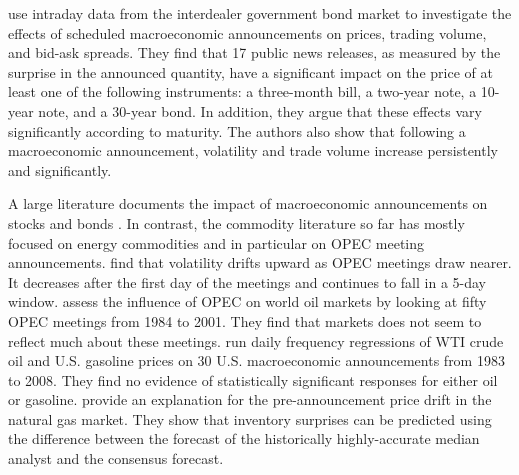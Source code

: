 \documentclass[12pt]{article}
\begin{document}
\citet{balduzzi2001economic}  use intraday data from the interdealer government bond market to investigate the effects of scheduled macroeconomic announcements on prices, trading volume, and bid-ask spreads. They find that 17 public news releases, as measured by the surprise in the announced quantity, have a significant impact on the price of at least one of the following instruments: a three-month bill, a two-year note, a 10-year note, and a 30-year bond. In addition, they argue that these effects vary significantly according to maturity. The authors also show that following a macroeconomic announcement, volatility and trade volume increase persistently and significantly.

A large literature documents the impact of macroeconomic announcements on stocks \citep{boyd2005stock,andersen2003micro,hu2017early,scholtus2014speed} and bonds \citep{fleming1997moves,fleming1999price,balduzzi2001economic}. In contrast, the commodity literature so far has mostly focused on energy commodities and in particular on OPEC meeting announcements.  \citet{horan2004implied} find that volatility drifts upward as OPEC meetings draw nearer. It decreases  after the first day of the meetings and continues to fall in a 5-day window. \citet{wirl2004impact} assess the influence of OPEC on world oil markets by looking at fifty OPEC meetings from 1984 to 2001. They find that markets does not seem to reflect much about these meetings. \citet{kilian2011energy} run daily frequency regressions of WTI crude oil and U.S. gasoline prices on 30 U.S. macroeconomic announcements from 1983 to 2008. They find no evidence of statistically significant responses for either oil or gasoline.  \citet{gu2018drives} provide an explanation for the pre-announcement price drift in the natural gas market. They show that inventory surprises can be predicted using the difference between the forecast of the historically highly-accurate median analyst and the consensus forecast.

\end{document}
